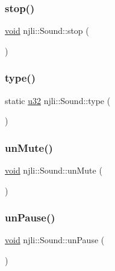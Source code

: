 \subsubsection{\texorpdfstring{stop()}{stop()}}
{\footnotesize\ttfamily \mbox{\hyperlink{_thread_8h_af1e856da2e658414cb2456cb6f7ebc66}{void}} njli\+::\+Sound\+::stop (\begin{DoxyParamCaption}{ }\end{DoxyParamCaption})}

\mbox{\label{classnjli_1_1_sound_a77826080c397a43ac8c78967aeea33f6}} 
\subsubsection{\texorpdfstring{type()}{type()}}
{\footnotesize\ttfamily static \mbox{\hyperlink{_util_8h_a10e94b422ef0c20dcdec20d31a1f5049}{u32}} njli\+::\+Sound\+::type (\begin{DoxyParamCaption}{ }\end{DoxyParamCaption})\hspace{0.3cm}{\ttfamily [static]}}

\mbox{\label{classnjli_1_1_sound_aec8eb5528c8c0f4abfd7a69b0fb48aff}} 
\subsubsection{\texorpdfstring{un\+Mute()}{unMute()}}
{\footnotesize\ttfamily \mbox{\hyperlink{_thread_8h_af1e856da2e658414cb2456cb6f7ebc66}{void}} njli\+::\+Sound\+::un\+Mute (\begin{DoxyParamCaption}{ }\end{DoxyParamCaption})}

\mbox{\label{classnjli_1_1_sound_ab6f878ee1163bab97ffffc98ee60789d}} 
\subsubsection{\texorpdfstring{un\+Pause()}{unPause()}}
{\footnotesize\ttfamily \mbox{\hyperlink{_thread_8h_af1e856da2e658414cb2456cb6f7ebc66}{void}} njli\+::\+Sound\+::un\+Pause (\begin{DoxyParamCaption}{ }\end{DoxyParamCaption})}



